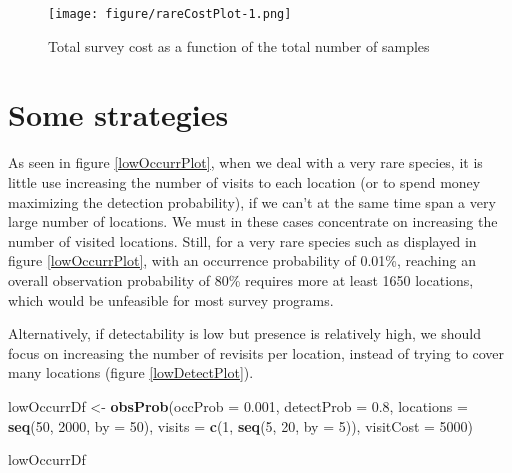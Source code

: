 \documentclass[]{article}
\newenvironment{Shaded}{\begin{snugshade}}{\end{snugshade}}
\newcommand{\KeywordTok}[1]{\textcolor[rgb]{0.13,0.29,0.53}{\textbf{#1}}}
\newcommand{\DataTypeTok}[1]{\textcolor[rgb]{0.13,0.29,0.53}{#1}}
\newcommand{\DecValTok}[1]{\textcolor[rgb]{0.00,0.00,0.81}{#1}}
\newcommand{\FloatTok}[1]{\textcolor[rgb]{0.00,0.00,0.81}{#1}}
\newcommand{\StringTok}[1]{\textcolor[rgb]{0.31,0.60,0.02}{#1}}
\newcommand{\NormalTok}[1]{#1}
\begin{document}
\begin{figure}
\centering
\texttt{[image: figure/rareCostPlot-1.png]}
\caption{Total survey cost as a function of the total number of samples
\label{rareCostPlot}}
\end{figure}

\section{Some strategies}\label{some-strategies}

As seen in figure \ref{lowOccurrPlot}, when we deal with a very rare
species, it is little use increasing the number of visits to each
location (or to spend money maximizing the detection probability), if we
can't at the same time span a very large number of locations. We must in
these cases concentrate on increasing the number of visited locations.
Still, for a very rare species such as displayed in figure
\ref{lowOccurrPlot}, with an occurrence probability of 0.01\%, reaching
an overall observation probability of 80\% requires more at least 1650
locations, which would be unfeasible for most survey programs.

Alternatively, if detectability is low but presence is relatively high,
we should focus on increasing the number of revisits per location,
instead of trying to cover many locations (figure \ref{lowDetectPlot}).

\begin{Shaded}
\begin{Highlighting}[]
\NormalTok{lowOccurrDf <-}\StringTok{ }\KeywordTok{obsProb}\NormalTok{(}\DataTypeTok{occProb =} \FloatTok{0.001}\NormalTok{, }\DataTypeTok{detectProb =} \FloatTok{0.8}\NormalTok{, }\DataTypeTok{locations =} \KeywordTok{seq}\NormalTok{(}\DecValTok{50}\NormalTok{, }
    \DecValTok{2000}\NormalTok{, }\DataTypeTok{by =} \DecValTok{50}\NormalTok{), }\DataTypeTok{visits =} \KeywordTok{c}\NormalTok{(}\DecValTok{1}\NormalTok{, }\KeywordTok{seq}\NormalTok{(}\DecValTok{5}\NormalTok{, }\DecValTok{20}\NormalTok{, }\DataTypeTok{by =} \DecValTok{5}\NormalTok{)), }\DataTypeTok{visitCost =} \DecValTok{5000}\NormalTok{)}

\NormalTok{lowOccurrDf}
\end{Highlighting}
\end{Shaded}
\end{document}
